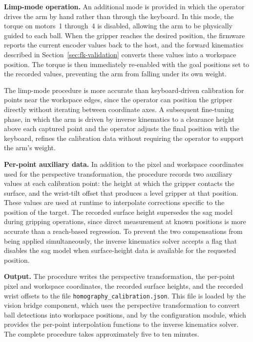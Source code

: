 \textbf{Limp-mode operation.} An additional mode is provided 
in which the operator drives the arm by hand rather than 
through the keyboard. In this mode, the torque on motors~1 
through~4 is disabled, allowing the arm to be physically 
guided to each ball. When the gripper reaches the desired 
position, the firmware reports the current encoder values back 
to the host, and the forward kinematics described in 
Section~\ref{sec:fk-validation} converts these values into a workspace position. 
The torque is then immediately re-enabled with the goal 
positions set to the recorded values, preventing the arm from 
falling under its own weight.

The limp-mode procedure is more accurate than keyboard-driven 
calibration for points near the workspace edges, since the 
operator can position the gripper directly without iterating 
between coordinate axes. A subsequent fine-tuning phase, in 
which the arm is driven by inverse kinematics to a clearance 
height above each captured point and the operator adjusts the 
final position with the keyboard, refines the calibration data 
without requiring the operator to support the arm's weight.

\textbf{Per-point auxiliary data.} In addition to the pixel 
and workspace coordinates used for the perspective 
transformation, the procedure records two auxiliary values at 
each calibration point: the height at which the gripper 
contacts the surface, and the wrist-tilt offset that produces 
a level gripper at that position. These values are used at 
runtime to interpolate corrections specific to the position 
of the target. The recorded surface height supersedes the 
sag model during gripping operations, since direct 
measurement at known positions is more accurate than a 
reach-based regression. To prevent the two compensations from 
being applied simultaneously, the inverse kinematics solver 
accepts a flag that disables the sag model when surface-height 
data is available for the requested position.

\textbf{Output.} The procedure writes the perspective 
transformation, the per-point pixel and workspace 
coordinates, the recorded surface heights, and the recorded 
wrist offsets to the file 
\texttt{homography\_calibration.json}. This file is loaded by 
the vision bridge component, which uses the perspective 
transformation to convert ball detections into workspace 
positions, and by the configuration module, which provides 
the per-point interpolation functions to the inverse 
kinematics solver. The complete procedure takes approximately 
five to ten minutes.

